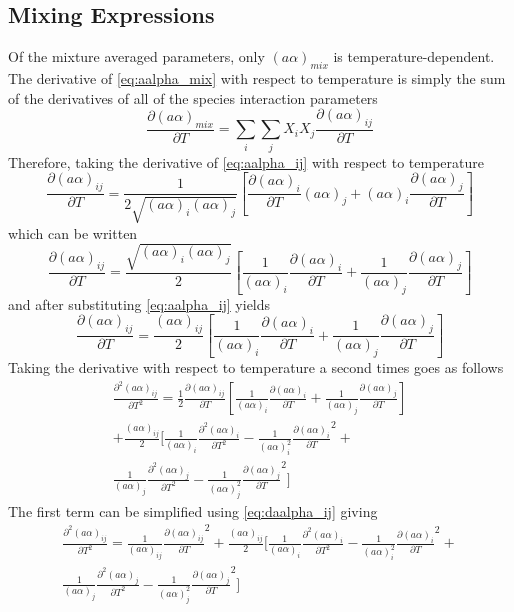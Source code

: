 \documentclass{article}
\newcommand{\pderiv}[2]{\frac{\partial #1}{\partial #2}}
\newcommand{\npderiv}[3]{\frac{\partial^#1 #2}{\partial #3^#1}}
\begin{document}
\subsection{Mixing Expressions}
Of the mixture averaged parameters, only $(a\alpha)_{mix}$ is temperature-dependent. The derivative of \eqref{eq:aalpha_mix} with respect to 
temperature is simply the sum of the derivatives of all of the species interaction parameters 
\begin{equation}
    \pderiv{(a\alpha)_{mix}}{T} = \sum_i \sum_j X_i X_j \pderiv{(a\alpha)_{ij}}{T}
\end{equation}
Therefore, taking the derivative of \eqref{eq:aalpha_ij} with respect to temperature
\begin{equation*}
    \pderiv{(a\alpha)_{ij}}{T} = \frac{1}{2\sqrt{(a\alpha)_i(a\alpha)_j}} \left[ \pderiv{(a\alpha)_i}{T} (a\alpha)_j + (a\alpha)_i \pderiv{(a\alpha)_j}{T}\right]
\end{equation*}
which can be written
\begin{equation*}
    \pderiv{(a\alpha)_{ij}}{T} = \frac{\sqrt{(a\alpha)_i(a\alpha)_j}}{2} \left[ \frac{1}{(a\alpha)_i}\pderiv{(a\alpha)_i}{T} + \frac{1}{(a\alpha)_j}\pderiv{(a\alpha)_j}{T}\right]
\end{equation*}
and after substituting \eqref{eq:aalpha_ij} yields
\begin{equation}
    \pderiv{(a\alpha)_{ij}}{T} = \frac{(a\alpha)_{ij}}{2} \left[ \frac{1}{(a\alpha)_i}\pderiv{(a\alpha)_i}{T} + \frac{1}{(a\alpha)_j}\pderiv{(a\alpha)_j}{T}\right] \label{eq:daalpha_ij}
\end{equation}
Taking the derivative with respect to temperature a second times goes as follows
\begin{equation*}
\begin{split}
    \npderiv{2}{(a\alpha)_{ij}}{T} = \frac{1}{2} \pderiv{(a\alpha)_{ij}}{T} \left[ \frac{1}{(a\alpha)_i}
    \pderiv{(a\alpha)_i}{T} + \frac{1}{(a\alpha)_j}\pderiv{(a\alpha)_j}{T}\right] \\ + \frac{(a\alpha)_{ij}}{2} 
    \biggl[ \frac{1}{(a\alpha)_i}\npderiv{2}{(a\alpha)_i}{T}-\frac{1}{(a\alpha)_i^2}\pderiv{(a\alpha)_i}{T}^2 + \\
    \frac{1}{(a\alpha)_j}\npderiv{2}{(a\alpha)_j}{T}-\frac{1}{(a\alpha)_j^2}\pderiv{(a\alpha)_j}{T}^2 \biggr]
\end{split}
\end{equation*}
The first term can be simplified using \eqref{eq:daalpha_ij} giving
\begin{equation}
\begin{split}
    \npderiv{2}{(a\alpha)_{ij}}{T} = \frac{1}{(a\alpha)_{ij}} \pderiv{(a\alpha)_{ij}}{T}^2 + \frac{(a\alpha)_{ij}}{2} 
    \biggl[ \frac{1}{(a\alpha)_i}\npderiv{2}{(a\alpha)_i}{T}-\frac{1}{(a\alpha)_i^2}\pderiv{(a\alpha)_i}{T}^2 + \\
    \frac{1}{(a\alpha)_j}\npderiv{2}{(a\alpha)_j}{T}-\frac{1}{(a\alpha)_j^2}\pderiv{(a\alpha)_j}{T}^2 \biggr]
\end{split}
\end{equation}
\end{document}
